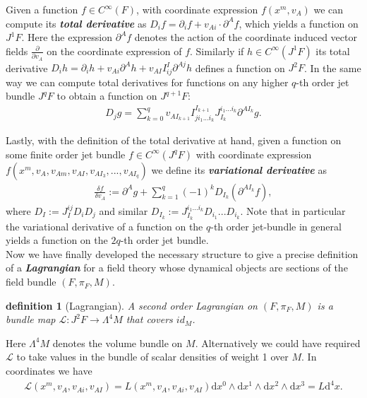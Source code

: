 \documentclass[a4paper,12pt, DIV=14, BCOR=5mm, twoside, headsepline]{scrbook}
\newtheorem{definition}{definition}[section]
\begin{document}
Given a function $f \in C^{\infty}(F)$, with coordinate expression $f(x^m, v_A)$ we can compute its \textit{\textbf{total derivative}} as $D_if = \partial_i f + v_{Ai}\cdot \partial^A f$, which yields a function on $J^1F$. Here the expression $\partial^A f$ denotes the action of the coordinate induced vector fields $\frac{\partial}{\partial v_A}$ on the coordinate expression of $f$. Similarly if $h \in C^{\infty}(J^1F)$ its total derivative $D_i h = \partial_i h + v_{Ai} \partial^A h + v_{AI}I^I_{ij} \partial ^{Aj} h$ defines a function on $J^2F$. In the same way we can compute total derivatives for functions on any higher $q$-th order jet bundle $J^qF$ to obtain a function on $J^{q+1}F$:
\begin{align}\label{totDer}
    D_j g = \sum _{k = 0}^{q}  v_{AI_{k+1}}I^{I_{k+1}}_{ji_1...i_k}J_{I_k}^{i_1...i_k}\partial^{AI_k} g.
\end{align}
 

Lastly, with the definition of the total derivative at hand, given a function on some finite order jet bundle $f \in C^{\infty}(J^qF)$ with coordinate expression $f(x^m,v_A,v_{Am},v_{AI},v_{AI_{3}},...,v_{AI_{q}})$ we define its \textit{\textbf{variational derivative}} as 
\begin{align}\label{varDer}
\frac{\delta f}{\delta v_A} := \partial^{A}g + \sum _{k = 1}^q (-1)^k D_{I_k}(\partial^{AI_k}f),
\end{align}
where $D_I := J_I ^{ij} D_i D_j$ and similar $D_{I_k} := J_{I_k}^{i_1...i_k} D_{i_1} ... D_{i_k}$.
Note that in particular the variational derivative of a function on the $q$-th order jet-bundle in general yields a function on the $2q$-th order jet bundle.\\

Now we have finally developed the necessary structure to give a precise definition of a \textbf{\textit{Lagrangian}} for a field theory whose dynamical objects are sections of the field bundle $(F, \pi_F,M)$.
\begin{definition}[Lagrangian]
A second order Lagrangian on $(F,\pi_F,M)$ is a bundle map $\mathcal{L} : J^2F \rightarrow \Lambda^4M$ that covers $id_M$.
\end{definition}
Here $\Lambda^4 M$ denotes the volume bundle on $M$. Alternatively we could have required $\mathcal{L}$ to take values in the bundle of scalar densities of weight 1 over $M$. In coordinates we have 
\begin{align}
    \mathcal{L}(x^m,v_A,v_{Ai},v_{AI}) = L(x^m,v_A,v_{Ai},v_{AI}) \mathrm{d}x^0 \wedge \mathrm{d}x^1 \wedge \mathrm{d}x^2 \wedge \mathrm{d}x^3 = L \mathrm{d}^4x.
\end{align} 
\end{document}
